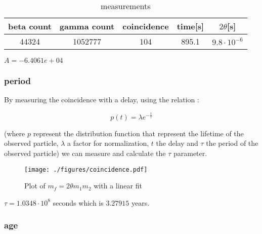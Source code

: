 \documentclass[a4paper,12pt,oneside]{article}
\def \be {\begin{equation}}
\def \ee {\end{equation}}
\begin{document}
	\begin{table}[h!]
	\centering
		\begin{tabular}{|c|c|c|c|c|}
			\hline
				beta count	&gamma count	&coincidence	&time[s] 	&$2\theta$[s]\\
			\hline
				44324		&1052777		&104			&895.1		&$9.8\cdot10^{-6}$\\
			\hline
		\end{tabular}
		\caption{measurements}
		\label{tab:poisson}
	\end{table}

	$A = -6.4061e+04 $




	



\subsubsection{period}

	By measuring the coincidence with a delay, using the relation :

	\be
		p(t)= \lambda e^{-\frac{t}{\tau}}
	\ee

	(where $p$ represent the distribution function that represent the lifetime of the observed particle, $\lambda$ a factor for normalization, $t$ the delay and $\tau$ the period of the observed particle) we can measure and calculate the $\tau$ parameter. 


	\begin{figure}[h!]
		\begin{center}
		\texttt{[image: ./figures/coincidence.pdf]}
		\caption{Plot of $	m_f = 2\theta m_1 m_2$ with a linear fit} \label{fig:2theta}
		\end{center}
	\end{figure}


	$\tau = 1.0348 \cdot 10^8$ seconds which is $3.27915$ years.

\subsubsection{age}
\end{document}

